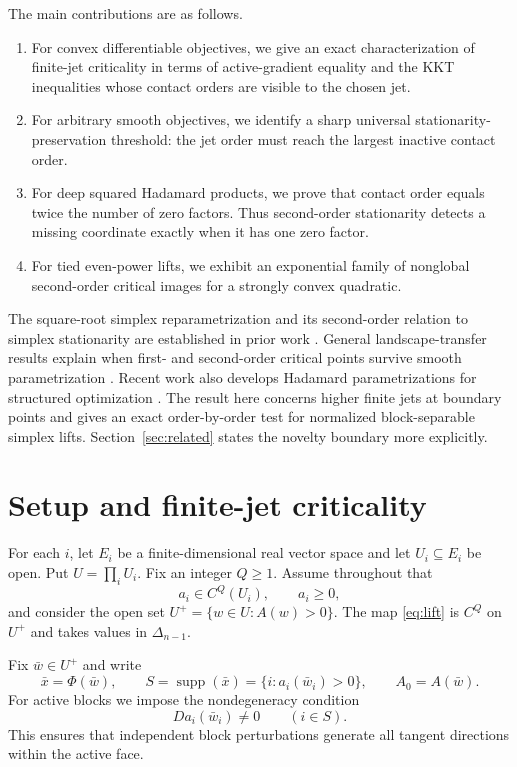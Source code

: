 \documentclass[11pt]{article}
\theoremstyle{definition}
\theoremstyle{remark}
\newcommand{\simplex}{\Delta_{n-1}}
\newcommand{\supp}{\operatorname{supp}}
\begin{document}
The main contributions are as follows.
\begin{enumerate}[label=(\roman*)]
  \item For convex differentiable objectives, we give an exact
  characterization of finite-jet criticality in terms of active-gradient
  equality and the KKT inequalities whose contact orders are visible to the
  chosen jet.
  \item For arbitrary smooth objectives, we identify a sharp universal
  stationarity-preservation threshold: the jet order must reach the largest
  inactive contact order.
  \item For deep squared Hadamard products, we prove that contact order equals
  twice the number of zero factors. Thus second-order stationarity detects a
  missing coordinate exactly when it has one zero factor.
  \item For tied even-power lifts, we exhibit an exponential family of
  nonglobal second-order critical images for a strongly convex quadratic.
\end{enumerate}

The square-root simplex reparametrization and its second-order relation to
simplex stationarity are established in prior work
\cite{LiMcKenzieYin2023,LevinKileelBoumal2024}. General landscape-transfer
results explain when first- and second-order critical points survive smooth
parametrization \cite{LevinKileelBoumal2024}. Recent work also develops
Hadamard parametrizations for structured optimization
\cite{TangToh2024,OuyangEtAl2024,KolbEtAl2026}. The result here concerns higher
finite jets at boundary points and gives an exact order-by-order test for
normalized block-separable simplex lifts. Section~\ref{sec:related} states the
novelty boundary more explicitly.

\section{Setup and finite-jet criticality}\label{sec:setup}

For each $i$, let $E_i$ be a finite-dimensional real vector space and let
$U_i\subseteq E_i$ be open. Put $U=\prod_i U_i$. Fix an integer $Q\ge 1$.
Assume throughout that
\[
  a_i\in C^Q(U_i),\qquad a_i\ge 0,
\]
and consider the open set $U^+=\{w\in U:A(w)>0\}$. The map \eqref{eq:lift}
is $C^Q$ on $U^+$ and takes values in $\simplex$.

Fix $\bar w\in U^+$ and write
\[
  \bar x=\Phi(\bar w),\qquad
  S=\supp(\bar x)=\{i:a_i(\bar w_i)>0\},
  \qquad A_0=A(\bar w).
\]
For active blocks we impose the nondegeneracy condition
\begin{equation}\label{eq:active-nondegenerate}
  Da_i(\bar w_i)\ne 0 \qquad (i\in S).
\end{equation}
This ensures that independent block perturbations generate all tangent
directions within the active face.
\end{document}
